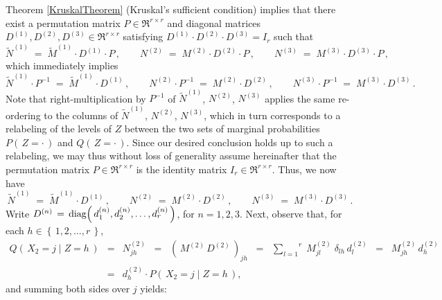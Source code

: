 \begin{enumerate}
	Theorem \ref{KruskalTheorem} (Kruskal's sufficient condition) implies that
	there exist a permutation matrix $P \in \Re^{r \times r}$ and diagonal matrices
	$D^{(1)}, D^{(2)}, D^{(3)} \in \Re^{r \times r}$ satisfying $D^{(1)} \cdot D^{(2)} \cdot D^{(3)} = I_{r}$
	such that
	\begin{equation*}
	\widetilde{N}^{(1)} \;=\; \widetilde{M}^{(1)} \cdot D^{(1)} \cdot P\,,
	\quad\mbox{}\quad
	N^{(2)} \;=\; M^{(2)} \cdot D^{(2)} \cdot P\,,
	\quad\mbox{}\quad
	N^{(3)} \;=\; M^{(3)} \cdot D^{(3)} \cdot P\,,
	\end{equation*}
	which immediately implies
	\begin{equation*}
	\widetilde{N}^{(1)} \cdot P^{-1} \;=\; \widetilde{M}^{(1)} \cdot D^{(1)}\,,
	\quad\mbox{}\quad
	N^{(2)} \cdot P^{-1} \;=\; M^{(2)} \cdot D^{(2)}\,,
	\quad\mbox{}\quad
	N^{(3)} \cdot P^{-1} \;=\; M^{(3)} \cdot D^{(3)}\,.
	\end{equation*}
	Note that right-multiplication by $P^{-1}$ of $\widetilde{N}^{(1)}$, $N^{(2)}$, $N^{(3)}$
	applies the same re-ordering to the columns of $\widetilde{N}^{(1)}$, $N^{(2)}$, $N^{(3)}$,
	which in turn corresponds to a relabeling of the levels of $Z$ between the two sets of marginal
	probabilities $P\!\left(\,Z=\cdot\,\right)$ and $Q\!\left(\,Z=\cdot\,\right)$.
	Since our desired conclusion holds up to such a relabeling, we may thus without loss of generality
	assume hereinafter that the permutation matrix $P \in \Re^{r \times r}$ is the identity matrix
	$I_{r} \in \Re^{r \times r}$.
	Thus, we now have
	\begin{equation*}
	\widetilde{N}^{(1)} \;=\; \widetilde{M}^{(1)} \cdot D^{(1)}\,,
	\quad\mbox{}\quad
	N^{(2)} \;=\; M^{(2)} \cdot D^{(2)}\,,
	\quad\mbox{}\quad
	N^{(3)} \;=\; M^{(3)} \cdot D^{(3)}\,.
	\end{equation*}
	Write $D^{(n)}\,=\,\textnormal{diag}\!\left(\,d^{(n)}_{1},d^{(n)}_{2},\ldots,d^{(n)}_{r}\,\right)$, for $n = 1,2,3$.
	Next, observe that, for each $h \in \left\{\,1,2,\ldots,r\,\right\}$,
	\begin{eqnarray*}
	Q\!\left(\,X_{2} = j \;\vert\; Z = h\,\right)
	& = & N^{(2)}_{jh}
	\;\;=\;\; \left(\,M^{(2)}\,D^{(2)}\,\right)_{jh}
	\;\;=\;\; \overset{r}{\underset{l=1}{\sum}}\;M^{(2)}_{jl}\;\delta_{lh}\,d^{(2)}_{l}
	\;\;=\;\; M^{(2)}_{jh}\,d^{(2)}_{h}
	\\
	& = & d^{(2)}_{h} \cdot P\!\left(\,X_{2} = j \;\vert\; Z = h\,\right),
	\end{eqnarray*}
	and summing both sides over $j$ yields:
	\begin{eqnarray*}

\end{eqnarray*}
\end{enumerate}
